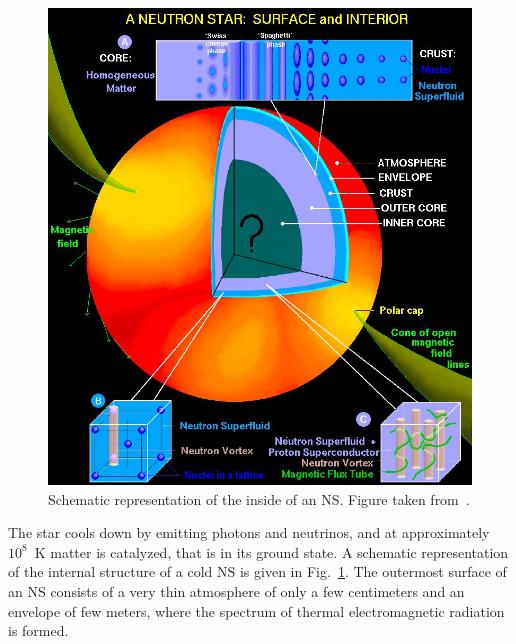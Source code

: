 \begin{figure}[!t]
\begin{center}
  \includegraphics[width=0.8\linewidth]{figures/NStarInt.jpeg}
\end{center}
\caption[Schematic representation of the inside of a neutron star]{Schematic
representation of the inside of an NS. Figure taken 
from~\cite{Page2006}.}\label{fig:NStarInt}
\end{figure}
% 
The star cools down by emitting photons and neutrinos, and at approximately
$10^8$~K matter is catalyzed, that is in its ground state.
A schematic representation of the internal structure of a cold NS is given in
Fig.~\ref{fig:NStarInt}.
The outermost surface of an NS consists of a very thin atmosphere of 
only a few centimeters and an envelope of few meters, where the spectrum of
thermal electromagnetic radiation is formed.  
